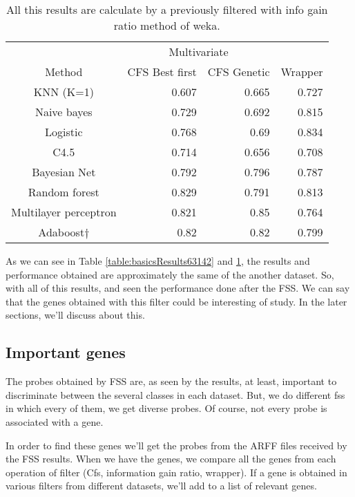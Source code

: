 \documentclass[conference,a4paper]{IEEEtran}
\begin{document}
\begin{table}[h]
	\caption{All this results are calculate by a previously filtered with info gain ratio method of weka.}
	\centering
	\begin{tabular}{c r r r}
		\hline\hline
		& \multicolumn{2}{c}{Multivariate} & \\
		Method & CFS Best first & CFS Genetic & Wrapper\\ [0.2ex]
		\hline
		KNN (K=1) & 0.607 & 0.665 & 0.727 \\
		Naive bayes & 0.729 & 0.692 & 0.815 \\
		Logistic & 0.768 & 0.69 & 0.834 \\
		C4.5 & 0.714 & 0.656 & 0.708 \\
		Bayesian Net & 0.792 & 0.796 & 0.787 \\
		Random forest & 0.829 & 0.791 & 0.813\\
		Multilayer perceptron & 0.821 & 0.85 & 0.764\\
		Adaboost$\dagger$ & 0.82 & 0.82 & 0.799\\ [1ex]
		\hline
	\end{tabular}
	\label{table:filteredResults63142}
\end{table}

As we can see in Table \ref{table:basicsResults63142} and \ref{table:filteredResults63142}, the results and performance obtained are approximately the same of the another dataset. So, with all of this results, and seen the performance done after the FSS. We can say that the genes obtained with this filter could be interesting of study. In the later sections, we'll discuss about this.

\subsection{Important genes}

The probes obtained by FSS are, as seen by the results, at least, important to discriminate between the several classes in each dataset. But, we do different fss in which every of them, we get diverse probes. Of course, not every probe is associated with a gene.

In order to find these genes we'll get the probes from the ARFF files received by the FSS results. When we have the genes, we compare all the genes from each operation of filter (Cfs, information gain ratio, wrapper). If a gene is obtained in various filters from different datasets, we'll add to a list of relevant genes. 
\end{document}
